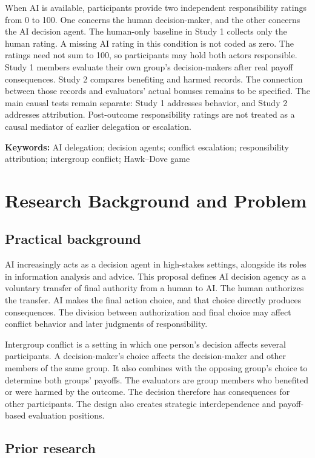\documentclass[11pt,a4paper]{article}
\begin{document}
When AI is available, participants provide two independent responsibility ratings from 0 to 100. One concerns the human decision-maker, and the other concerns the AI decision agent. The human-only baseline in Study 1 collects only the human rating. A missing AI rating in this condition is not coded as zero. The ratings need not sum to 100, so participants may hold both actors responsible. Study 1 members evaluate their own group's decision-makers after real payoff consequences. Study 2 compares benefiting and harmed records. The connection between those records and evaluators' actual bonuses remains to be specified. The main causal tests remain separate: Study 1 addresses behavior, and Study 2 addresses attribution. Post-outcome responsibility ratings are not treated as a causal mediator of earlier delegation or escalation.

\textbf{Keywords:} AI delegation; decision agents; conflict escalation; responsibility attribution; intergroup conflict; Hawk--Dove game

\section{Research Background and Problem}

\subsection{Practical background}

AI increasingly acts as a decision agent in high-stakes settings, alongside its roles in information analysis and advice. This proposal defines AI decision agency as a voluntary transfer of final authority from a human to AI. The human authorizes the transfer. AI makes the final action choice, and that choice directly produces consequences. The division between authorization and final choice may affect conflict behavior and later judgments of responsibility.

Intergroup conflict is a setting in which one person's decision affects several participants. A decision-maker's choice affects the decision-maker and other members of the same group. It also combines with the opposing group's choice to determine both groups' payoffs. The evaluators are group members who benefited or were harmed by the outcome. The decision therefore has consequences for other participants. The design also creates strategic interdependence and payoff-based evaluation positions.

\subsection{Prior research}
\end{document}
